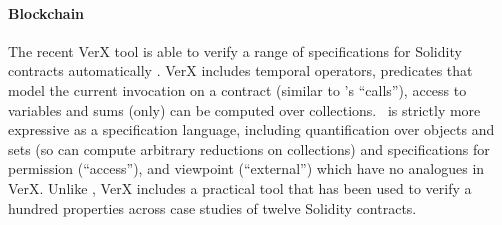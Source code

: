 {\paragraph{Blockchain}



The recent VerX tool is able to verify a range of
specifications for Solidity contracts automatically \cite{VerX}.
VerX includes  temporal operators, predicates that
model the current invocation on a contract (similar to \Chainmail's
``calls''), access to variables
and  sums (only) can be computed over collections. 
\Chainmail\ is strictly more expressive as a
specification language, including quantification over objects and sets
(so can compute arbitrary reductions on collections) and %
specifications for permission (``access''), %
and viewpoint (``external'') which have no analogues in VerX. 
Unlike \Chainmail, VerX includes a practical tool that has
been used to verify a hundred properties across case studies of
twelve Solidity contracts.

}
